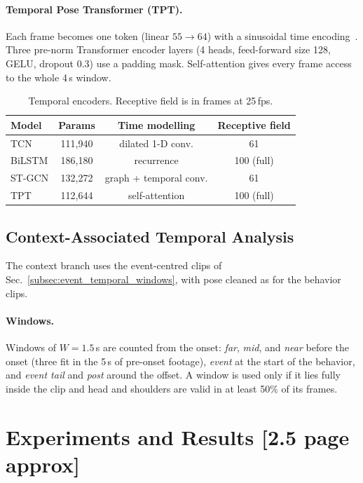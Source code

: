 \documentclass[10pt,twocolumn,letterpaper]{article}
\begin{document}
\paragraph{Temporal Pose Transformer (TPT).}
Each frame becomes one token (linear $55{\to}64$) with a sinusoidal time encoding~\cite{KEY_transformer}. Three pre-norm Transformer encoder layers (4 heads, feed-forward size 128, GELU, dropout 0.3) use a padding mask. Self-attention gives every frame access to the whole 4\,s window.

\begin{table}[t]
\centering
\footnotesize
\setlength{\tabcolsep}{4pt}
\caption{Temporal encoders. Receptive field is in frames at 25\,fps.}
\label{tab:arch}
\begin{tabular}{lccc}
\toprule
Model & Params & Time modelling & Receptive field \\
\midrule
TCN & 111,940 & dilated 1-D conv. & 61 \\
BiLSTM & 186,180 & recurrence & 100 (full) \\
ST-GCN & 132,272 & graph + temporal conv. & 61 \\
TPT & 112,644 & self-attention & 100 (full) \\
\bottomrule
\end{tabular}
\end{table}

\subsection{Context-Associated Temporal Analysis}
\label{subsec:context_temporal_analysis}
The context branch uses the event-centred clips of Sec.~\ref{subsec:event_temporal_windows}, with pose cleaned as for the behavior clips.

\paragraph{Windows.}
Windows of $W{=}1.5$\,s are counted from the onset: \emph{far}, \emph{mid}, and \emph{near} before the onset (three fit in the 5\,s of pre-onset footage), \emph{event} at the start of the behavior, and \emph{event tail} and \emph{post} around the offset. A window is used only if it lies fully inside the clip and head and shoulders are valid in at least 50\% of its frames.




\section{Experiments and Results [2.5 page approx]}
\end{document}
